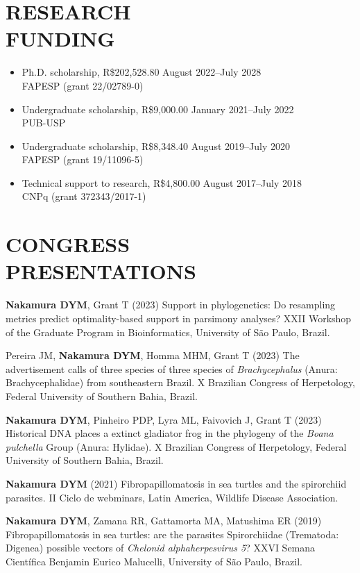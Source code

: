 \documentclass[margin, 10pt]{res} %
\begin{document}
\begin{resume}
\section{RESEARCH \\FUNDING}

\begin{itemize}
\item Ph.D. scholarship, R\$202,528.80 \hfill August 2022--July 2028 \\
FAPESP (grant 22/02789-0)
\item Undergraduate scholarship, R\$9,000.00 \hfill January 2021--July 2022 \\
PUB-USP
\item Undergraduate scholarship, R\$8,348.40 \hfill August 2019--July 2020 \\
FAPESP (grant 19/11096-5)
\item Technical support to research, R\$4,800.00 \hfill August 2017--July 2018 \\
CNPq (grant 372343/2017-1)
\end{itemize}


\section{CONGRESS \\ PRESENTATIONS}

\begin{etaremune}
\item \textbf{Nakamura DYM}, Grant T (2023) Support in phylogenetics: Do resampling metrics predict optimality-based support in parsimony analyses? XXII Workshop of the Graduate Program in Bioinformatics, University of São Paulo, Brazil.
\item Pereira JM, \textbf{Nakamura DYM}, Homma MHM, Grant T (2023) The advertisement calls of three species of three species of \emph{Brachycephalus} (Anura: Brachycephalidae) from southeastern Brazil. X Brazilian Congress of Herpetology, Federal University of Southern Bahia, Brazil. 
\item \textbf{Nakamura DYM}, Pinheiro PDP, Lyra ML, Faivovich J, Grant T (2023) Historical DNA places a  extinct gladiator frog in the phylogeny of the \emph{Boana pulchella} Group (Anura: Hylidae). X Brazilian Congress of Herpetology, Federal University of Southern Bahia, Brazil. 
\item \textbf{Nakamura DYM} (2021) Fibropapillomatosis in sea turtles and the spirorchiid parasites. II Ciclo de webminars, Latin America, Wildlife Disease Association.
\item \textbf{Nakamura DYM}, Zamana RR, Gattamorta MA, Matushima ER (2019) Fibropapillomatosis in sea turtles: are the parasites Spirorchiidae (Trematoda: Digenea) possible vectors of \textit{Chelonid alphaherpesvirus 5}? XXVI Semana Científica Benjamin Eurico Malucelli, University of São Paulo, Brazil.
\end{etaremune}


\end{resume}
\end{document}
